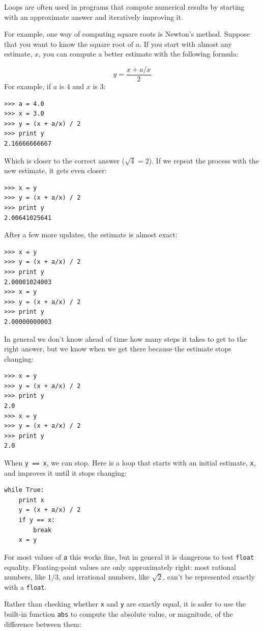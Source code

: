 \documentclass[10pt]{book}
\begin{document}
\begin{CJK}{UTF8}{gbsn}
Loops are often used in programs that compute
numerical results by starting with an approximate answer and
iteratively improving it.

For example, one way of computing square roots is Newton's method.
Suppose that you want to know the square root of $a$.  If you start
with almost any estimate, $x$, you can compute a better
estimate with the following formula:

\[ y = \frac{x + a/x}{2} \]
%
For example, if $a$ is 4 and $x$ is 3:

\begin{verbatim}
>>> a = 4.0
>>> x = 3.0
>>> y = (x + a/x) / 2
>>> print y
2.16666666667
\end{verbatim}
%
Which is closer to the correct answer ($\sqrt{4} = 2$).  If we
repeat the process with the new estimate, it gets even closer:

\begin{verbatim}
>>> x = y
>>> y = (x + a/x) / 2
>>> print y
2.00641025641
\end{verbatim}
%
After a few more updates, the estimate is almost exact:

\begin{verbatim}
>>> x = y
>>> y = (x + a/x) / 2
>>> print y
2.00001024003
>>> x = y
>>> y = (x + a/x) / 2
>>> print y
2.00000000003
\end{verbatim}
%
In general we don't know ahead of time how many steps it takes
to get to the right answer, but we know when we get there
because the estimate
stops changing:

\begin{verbatim}
>>> x = y
>>> y = (x + a/x) / 2
>>> print y
2.0
>>> x = y
>>> y = (x + a/x) / 2
>>> print y
2.0
\end{verbatim}
%
When {\tt y == x}, we can stop.  Here is a loop that starts
with an initial estimate, {\tt x}, and improves it until it
stops changing:

\begin{verbatim}
while True:
    print x
    y = (x + a/x) / 2
    if y == x:
        break
    x = y
\end{verbatim}
%
For most values of {\tt a} this works fine, but in general it is
dangerous to test {\tt float} equality.
Floating-point values are only approximately right:
most rational numbers, like $1/3$, and irrational numbers, like
$\sqrt{2}$, can't be represented exactly with a {\tt float}.

Rather than checking whether {\tt x} and {\tt y} are exactly equal, it
is safer to use the built-in function {\tt abs} to compute the
absolute value, or magnitude, of the difference between them:


\end{CJK}
\end{document}
